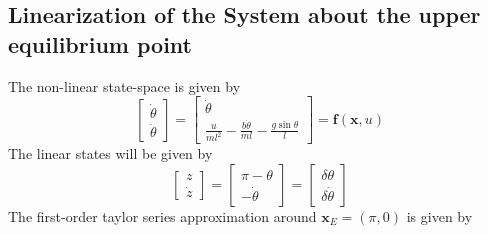 \subsection{Linearization of the System about the upper equilibrium point}
The non-linear state-space is given by
\begin{equation*}
	\begin{bmatrix}
		\dot{\theta}\\
		\ddot{\theta}
	\end{bmatrix} = \begin{bmatrix}
	\dot{\theta}\\
	\frac{u}{ml^2} - \frac{b\dot{\theta}}{ml} - \frac{g\sin\theta}{l}
\end{bmatrix} = \bm{f}\left(\bm{x},u\right)
\end{equation*}
The linear states will be given by
\begin{equation*}
	\begin{bmatrix}
		z\\
		\dot{z}
	\end{bmatrix} = \begin{bmatrix}
	\pi - \theta\\
	-\dot{\theta}
\end{bmatrix} = \begin{bmatrix}
\delta \theta\\
\delta\dot{\theta}
\end{bmatrix}
\end{equation*}
The first-order taylor series approximation around $\bm{x}_E = \left(\pi,0\right)$ is given by
